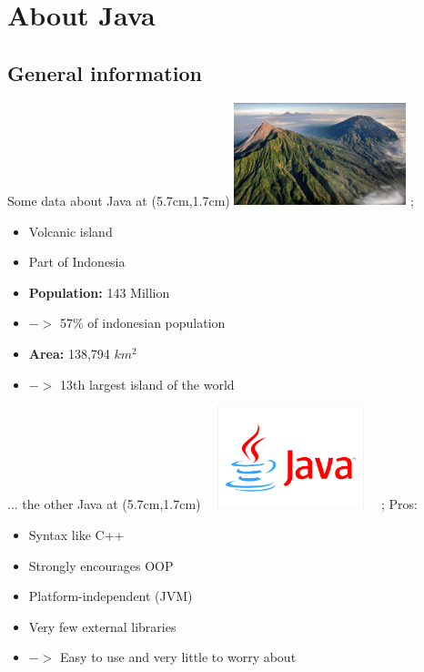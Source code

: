 \section{About Java}
\subsection{General information}
\begin{frame}{Some data about Java}
	\tikzoverlay at (5.7cm,1.7cm) {
		\includegraphics[width=5cm, height=3cm]{res/java-island.jpg}
	};
	\begin{itemize}
		\item Volcanic island
		\item Part of Indonesia
		\item \textbf{Population:} 143 Million
		\item[] $->$ 57\% of indonesian population
		\item \textbf{Area:} 138,794 $km^2$
		\item[] $->$ 13th largest island of the world
	\end{itemize}
	
	
\end{frame}

\begin{frame}{... the other Java}
	\tikzoverlay at (5.7cm,1.7cm) {
		\includegraphics[width=5cm, height=3cm]{res/logo-java.jpg}
	};
	Pros:
	\begin{itemize}
		\item Syntax like C++
		\item Strongly encourages OOP
		\item Platform-independent (JVM)
		\item Very few external libraries
		\item[] $->$ Easy to use and very little to worry about
	\end{itemize}	
\end{frame}

